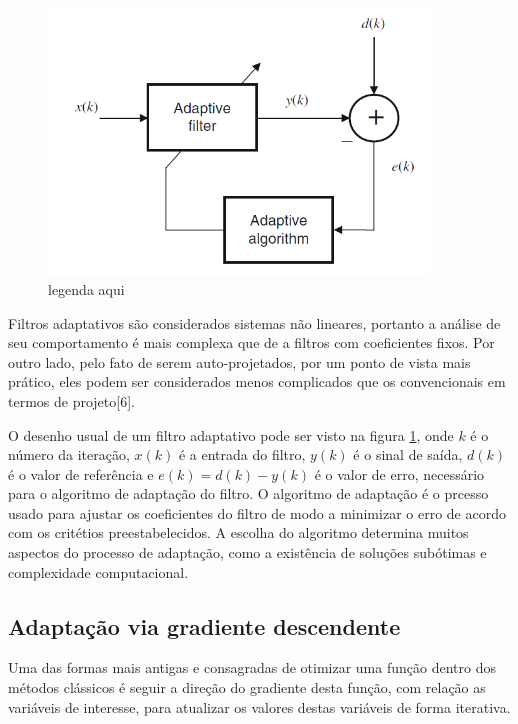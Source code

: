 \documentclass[a4paper, 12pt]{book}
\begin{document}
\begin{figure}[h]
    \centering
    \includegraphics[width=0.9\textwidth]{figuras/fA.png}
    \caption{legenda aqui}
    \label{fig:filtroAdaptativo}
\end{figure}

\indent Filtros adaptativos são considerados sistemas não lineares, portanto a análise de seu comportamento é mais complexa que de a filtros com coeficientes fixos. Por outro lado, pelo fato de serem auto-projetados, por um ponto de vista mais prático, eles podem ser considerados menos complicados que os convencionais em termos de projeto[6].

\indent O desenho usual de um filtro adaptativo pode ser visto na figura \ref{fig:filtroAdaptativo}, onde $k$ é o número da iteração, $x(k)$ é a entrada do filtro, $y(k)$ é o sinal de saída, $d(k)$ é o valor de referência e $e(k)=d(k)-y(k)$ é o valor de erro, necessário para o algoritmo de adaptação do filtro. O algoritmo de adaptação é o prcesso usado para ajustar os coeficientes do filtro de modo a minimizar o erro de acordo com os critétios preestabelecidos. A escolha do algoritmo determina muitos aspectos do processo de adaptação, como a existência de soluções subótimas e complexidade computacional.

\subsection{Adaptação via gradiente descendente}

Uma das formas mais antigas e consagradas de otimizar uma função dentro dos métodos clássicos é seguir a direção do gradiente desta função, com relação as variáveis de interesse, para atualizar os valores destas variáveis de forma iterativa.
\end{document}
